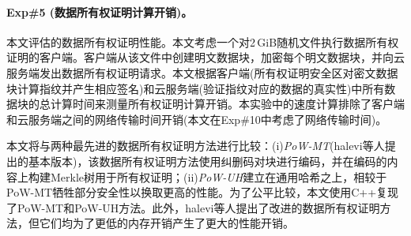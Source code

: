 \paragraph*{Exp\#5 (数据所有权证明计算开销)。}本文评估\sysnameS 的数据所有权证明性能。本文考虑一个对2\,GiB随机文件执行数据所有权证明的客户端。客户端从该文件中创建明文数据块，加密每个明文数据块，并向云服务端发出数据所有权证明请求。本文根据客户端(所有权证明安全区对密文数据块计算指纹并产生相应签名)和云服务端(验证指纹对应的数据的真实性)中所有数据块的总计算时间来测量所有权证明计算开销。本实验中的速度计算排除了客户端和云服务端之间的网络传输时间开销(本文在Exp\#10中考虑了网络传输时间)。

本文将\sysnameS 与两种最先进的数据所有权证明方法进行比较：(i)\textit{PoW-MT}(halevi等人提出的基本版本)，该数据所有权证明方法使用纠删码对块进行编码，并在编码的内容上构建Merkle树用于所有权证明；(ii)\textit{PoW-UH}建立在通用哈希之上，相较于PoW-MT牺牲部分安全性以换取更高的性能。为了公平比较，本文使用C++复现了PoW-MT和PoW-UH方法。此外，halevi等人提出了改进的数据所有权证明方法，但它们均为了更低的内存开销产生了更大的性能开销。

